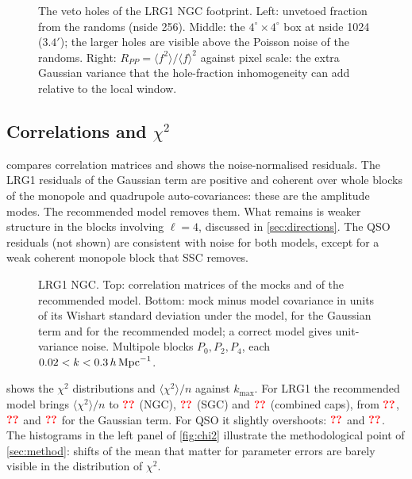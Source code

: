 \begin{figure}
  \centering{}
  \caption{The veto holes of the LRG1 NGC footprint. Left: unvetoed fraction from the randoms (nside 256). Middle: the $4^\circ\times4^\circ$ box at nside 1024 ($3.4'$); the larger holes are visible above the Poisson noise of the randoms. Right: $R_{PP}=\langle f^2\rangle/\langle f\rangle^2$ against pixel scale: the extra Gaussian variance that the hole-fraction inhomogeneity can add relative to the local window.}
  \label{fig:holes}
\end{figure}

\subsection{Correlations and \texorpdfstring{$\chi^2$}{chi2}}
\label{sec:corr}

 compares correlation matrices and shows the noise-normalised residuals. The LRG1 residuals of the Gaussian term are positive and coherent over whole blocks of the monopole and quadrupole auto-covariances: these are the amplitude modes. The recommended model removes them. What remains is weaker structure in the blocks involving $\ell=4$, discussed in \cref{sec:directions}. The QSO residuals (not shown) are consistent with noise for both models, except for a weak coherent monopole block that SSC removes.

\begin{figure}
  \centering{}
  \caption{LRG1 NGC. Top: correlation matrices of the mocks and of the recommended model. Bottom: mock minus model covariance in units of its Wishart standard deviation under the model, for the Gaussian term and for the recommended model; a correct model gives unit-variance noise. Multipole blocks $P_0,P_2,P_4$, each $0.02<k<0.3\,h\,\mathrm{Mpc}^{-1}$.}
  \label{fig:corr}
\end{figure}

 shows the $\chi^2$ distributions and $\langle\chi^2\rangle/n$ against $k_{\max}$. For LRG1 the recommended model brings $\langle\chi^2\rangle/n$ to $\val{trace/LRG1/NGC/rec/0.3}$ (NGC), $\val{trace/LRG1/SGC/rec/0.3}$ (SGC) and $\val{trace/LRG1/GCcomb/rec/0.3}$ (combined caps), from $\val{trace/LRG1/NGC/G/0.3}$, $\val{trace/LRG1/SGC/G/0.3}$ and $\val{trace/LRG1/GCcomb/G/0.3}$ for the Gaussian term. For QSO it slightly overshoots: $\val{trace/QSO/NGC/rec/0.3}$ and $\val{trace/QSO/SGC/rec/0.3}$. The histograms in the left panel of \cref{fig:chi2} illustrate the methodological point of \cref{sec:method}: shifts of the mean that matter for parameter errors are barely visible in the distribution of $\chi^2$.

